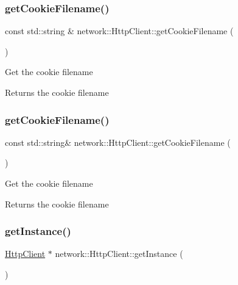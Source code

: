 \subsubsection{\texorpdfstring{get\+Cookie\+Filename()}{getCookieFilename()}\hspace{0.1cm}{\footnotesize\ttfamily [1/2]}}
{\footnotesize\ttfamily const std\+::string \& network\+::\+Http\+Client\+::get\+Cookie\+Filename (\begin{DoxyParamCaption}{ }\end{DoxyParamCaption})}

Get the cookie filename

\begin{DoxyReturn}{Returns}
the cookie filename 
\end{DoxyReturn}
\mbox{\label{classnetwork_1_1HttpClient_a502f57c5fa481e85d33b1eeaa4f8dc8e}} 
\subsubsection{\texorpdfstring{get\+Cookie\+Filename()}{getCookieFilename()}\hspace{0.1cm}{\footnotesize\ttfamily [2/2]}}
{\footnotesize\ttfamily const std\+::string\& network\+::\+Http\+Client\+::get\+Cookie\+Filename (\begin{DoxyParamCaption}{ }\end{DoxyParamCaption})}

Get the cookie filename

\begin{DoxyReturn}{Returns}
the cookie filename 
\end{DoxyReturn}
\mbox{\label{classnetwork_1_1HttpClient_aaa75d95d6615df0a573ee4839a49bb8a}} 
\subsubsection{\texorpdfstring{get\+Instance()}{getInstance()}\hspace{0.1cm}{\footnotesize\ttfamily [1/2]}}
{\footnotesize\ttfamily \hyperlink{classnetwork_1_1HttpClient}{Http\+Client} $\ast$ network\+::\+Http\+Client\+::get\+Instance (\begin{DoxyParamCaption}{ }\end{DoxyParamCaption})\hspace{0.3cm}{\ttfamily [static]}}

